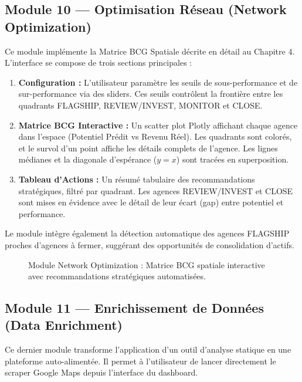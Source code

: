 \subsection{Module 10 — Optimisation Réseau (Network Optimization)}

Ce module implémente la Matrice BCG Spatiale décrite en détail au Chapitre 4. L'interface se compose de trois sections principales :

\begin{enumerate}
    \item \textbf{Configuration :} L'utilisateur paramètre les seuils de sous-performance et de sur-performance via des sliders. Ces seuils contrôlent la frontière entre les quadrants FLAGSHIP, REVIEW/INVEST, MONITOR et CLOSE.
    \item \textbf{Matrice BCG Interactive :} Un scatter plot Plotly affichant chaque agence dans l'espace (Potentiel Prédit vs Revenu Réel). Les quadrants sont colorés, et le survol d'un point affiche les détails complets de l'agence. Les lignes médianes et la diagonale d'espérance ($y = x$) sont tracées en superposition.
    \item \textbf{Tableau d'Actions :} Un résumé tabulaire des recommandations stratégiques, filtré par quadrant. Les agences REVIEW/INVEST et CLOSE sont mises en évidence avec le détail de leur écart (gap) entre potentiel et performance.
\end{enumerate}

Le module intègre également la détection automatique des agences FLAGSHIP proches d'agences à fermer, suggérant des opportunités de consolidation d'actifs.

\begin{figure}[h]
    \centering
    \caption{Module Network Optimization : Matrice BCG spatiale interactive avec recommandations stratégiques automatisées.}
    \label{fig:screenshot_bcg}
\end{figure}

\subsection{Module 11 — Enrichissement de Données (Data Enrichment)}

Ce dernier module transforme l'application d'un outil d'analyse statique en une plateforme auto-alimentée. Il permet à l'utilisateur de lancer directement le scraper Google Maps depuis l'interface du dashboard.

